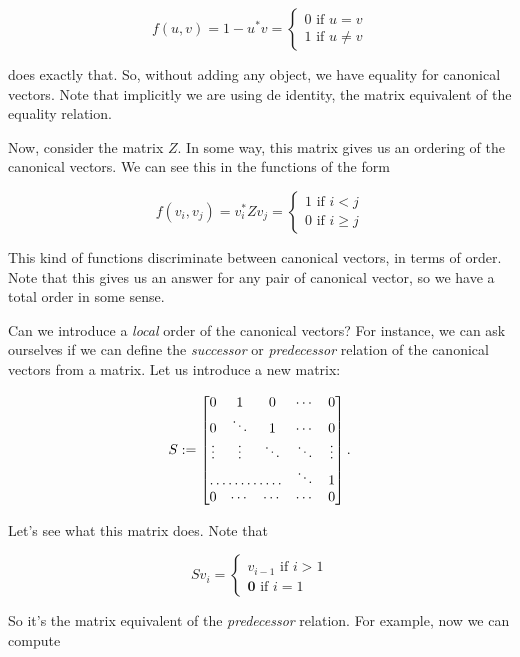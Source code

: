 \[
  			f(u,v)=1-u^*v=\begin{cases}
               0 \text{ if } u=v \\
               1 \text{ if } u\neq v
            \end{cases}
		\]

does exactly that. So, without adding any object, we have equality for canonical vectors. Note that implicitly we are using de identity, the matrix equivalent of the equality relation.


Now, consider the matrix $Z$. In some way, this matrix gives us an ordering of the canonical vectors. We can see this in the functions of the form 

\[
  			f(v_i, v_j)=v_i^*Zv_j=\begin{cases}
               1 \text{ if } i < j \\
               0 \text{ if } i \geq j
            \end{cases}
		\]

This kind of functions discriminate between canonical vectors, in terms of order. Note that this gives us an answer for any pair of canonical vector, so we have a total order in some sense.

Can we introduce a \textit{local} order of the canonical vectors? For instance, we can ask ourselves if we can define the \textit{successor} or \textit{predecessor} relation of the canonical vectors from a matrix. Let us introduce a new matrix:

\[
S := \begin{bmatrix}
    0 & 1         & 0         & \cdots &  0 \\
    0 & \ddots & 1         & \cdots & 0 \\
    \vdots & \vdots & \ddots & \ddots & \vdots \\
    \hdotsfor{3} & \ddots & 1 \\
    0 & \cdots & \cdots & \cdots & 0 
\end{bmatrix}.
\]

Let's see what this matrix does. Note that

\[
  			Sv_i=\begin{cases}
               v_{i-1} \text{ if } i > 1 \\
              \mathbf{0} \text{ if } i = 1
            \end{cases}
		\]

So it's the matrix equivalent of the \textit{predecessor} relation. For example, now we can compute 

